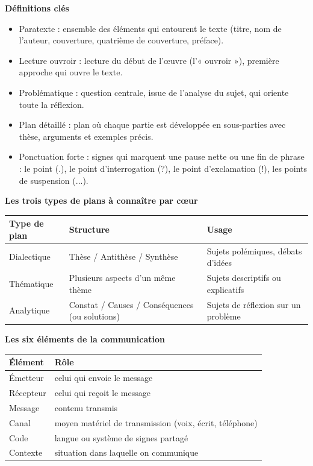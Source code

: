 \documentclass[11pt]{article}
\newcommand{\cle}[1]{{\popxbold\color{popdark}#1}}
\begin{document}
\begin{bilan}
\textbf{Définitions clés}
\begin{itemize}
  \item \cle{Paratexte} : ensemble des éléments qui entourent le texte (titre, nom de l'auteur, couverture, quatrième de couverture, préface).
  \item \cle{Lecture ouvroir} : lecture du début de l'œuvre (l'« ouvroir »), première approche qui ouvre le texte.
  \item \cle{Problématique} : question centrale, issue de l'analyse du sujet, qui oriente toute la réflexion.
  \item \cle{Plan détaillé} : plan où chaque partie est développée en sous-parties avec thèse, arguments et exemples précis.
  \item \cle{Ponctuation forte} : signes qui marquent une pause nette ou une fin de phrase : le point (.), le point d'interrogation (?), le point d'exclamation (!), les points de suspension (...).
\end{itemize}

\textbf{Les trois types de plans à connaître par cœur}
\begin{center}
\begin{tabularx}{\linewidth}{|l|X|X|}
\hline
\rowcolor{popblueL} \textbf{Type de plan} & \textbf{Structure} & \textbf{Usage} \\
\hline
Dialectique & Thèse / Antithèse / Synthèse & Sujets polémiques, débats d'idées \\
\hline
Thématique & Plusieurs aspects d'un même thème & Sujets descriptifs ou explicatifs \\
\hline
Analytique & Constat / Causes / Conséquences (ou solutions) & Sujets de réflexion sur un problème \\
\hline
\end{tabularx}
\end{center}

\textbf{Les six éléments de la communication}
\begin{center}
\begin{tabularx}{\linewidth}{|l|X|}
\hline
\rowcolor{popgreenL} \textbf{Élément} & \textbf{Rôle} \\
\hline
Émetteur & celui qui envoie le message \\
\hline
Récepteur & celui qui reçoit le message \\
\hline
Message & contenu transmis \\
\hline
Canal & moyen matériel de transmission (voix, écrit, téléphone) \\
\hline
Code & langue ou système de signes partagé \\
\hline
Contexte & situation dans laquelle on communique \\
\hline
\end{tabularx}
\end{center}


\end{bilan}
\end{document}
